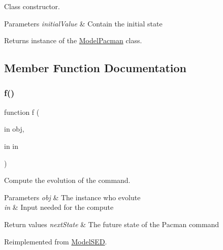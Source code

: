 Class constructor. 


\begin{DoxyParams}{Parameters}
{\em initial\+Value} & Contain the initial state \\
\hline
\end{DoxyParams}
\begin{DoxyReturn}{Returns}
instance of the \hyperlink{class_model_pacman}{Model\+Pacman} class. 
\end{DoxyReturn}


\subsection{Member Function Documentation}
\mbox{\label{class_model_pacman_a6f3b146c92a207e95690d08975e1e072}} 
\subsubsection{\texorpdfstring{f()}{f()}}
{\footnotesize\ttfamily function f (\begin{DoxyParamCaption}\item[{in}]{obj,  }\item[{in}]{in }\end{DoxyParamCaption})\hspace{0.3cm}{\ttfamily [virtual]}}



Compute the evolution of the command. 


\begin{DoxyParams}{Parameters}
{\em obj} & The instance who evolute \\
\hline
{\em in} & Input needed for the compute \\
\hline
\end{DoxyParams}

\begin{DoxyRetVals}{Return values}
{\em next\+State} & The future state of the Pacman command \\
\hline
\end{DoxyRetVals}


Reimplemented from \hyperlink{class_model_s_e_d_ac36f9451c43b120828af4380858f2024}{Model\+S\+ED}.

\mbox{\label{class_model_pacman_a07dadfabe92bf9a144b8a862720e7746}} 
